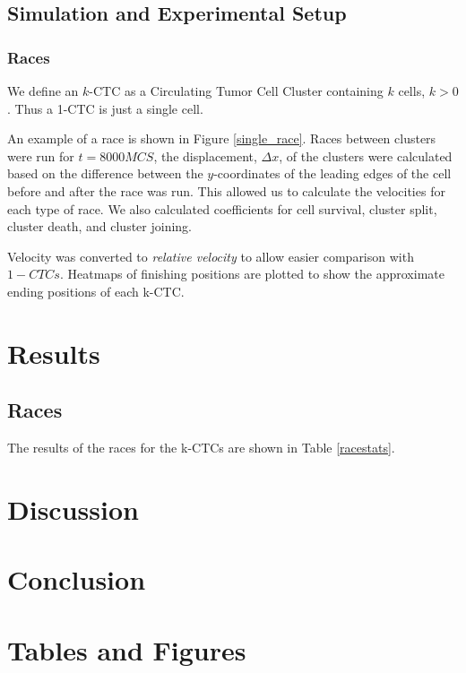 \documentclass[12pt]{article}
\begin{document}
\subsection{Simulation and Experimental Setup}
\subsubsection{Races}
We define an $k$-CTC as a Circulating Tumor Cell Cluster containing $k$ cells, $k>0$. Thus a 1-CTC is just a single cell.

An example of a race is shown in  Figure \ref{single_race}. Races between clusters were run for $t=8000MCS$, the displacement, $\Delta x$, of the clusters were calculated based on the difference between the $y$-coordinates of the leading edges of the cell before and after the race was run. This allowed us to calculate the velocities for each type of race. We also calculated coefficients for cell survival, cluster split, cluster death, and cluster joining. 

Velocity was converted to \emph{relative velocity} to allow easier comparison with $1-CTCs$. Heatmaps of finishing positions are plotted to show the approximate ending positions of each k-CTC.
\section{Results}
\subsection{Races}
The results of the races for the k-CTCs are shown in Table \ref{racestats}.
\section{Discussion}
\section{Conclusion}

\pagebreak
\section{Tables and Figures}
\end{document}
